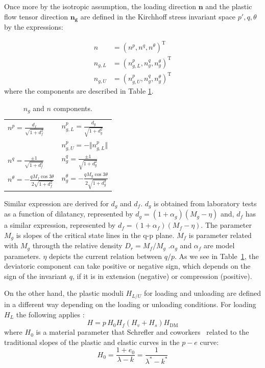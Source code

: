 \documentclass[preprint,12pt,a4paper]{elsarticle}
\begin{document}
Once more by the isotropic assumption, the loading direction $ \boldsymbol{n}$ and the plastic flow tensor direction $ \boldsymbol{n_g}$ are defined in the Kirchhoff stress invariant space $p', q, \theta $ by the expressions:

\begin{eqnarray}
n &=\left(n^{p}, n^{q}, n^{\theta}\right)^{\mathrm{T}} \\ n_{g,L} &=\left(n_{g,L}^{p}, n_{g}^{q}, n_{g}^{\theta}\right)^{\mathrm{T}}
\\ n_{g,U} &=\left(n_{g,U}^{p}, n_{g}^{q}, n_{g}^{\theta}\right)^{\mathrm{T}}
\end{eqnarray}
where the components are described in Table \ref{tab1}.

\begin{table}[H]
\caption{\label{tab1} $n_{g}$ and $n$ components.} 
\centering
	\begin{tabular}{l|l}
        $n^{p} =\frac{d_{f}}{\sqrt{1+d_{f}^{2}}}$ &
        $n_{g,L}^{p} =\frac{d_{g}}{\sqrt{1+d_{g}^{2}}}$
        \\ 
         &
        $n_{g,U}^{p} = -\Vert n_{g,L}^{p} \Vert$ \\
        $n^{q} =\frac{\pm 1}{\sqrt{1+d_{f}^{2}}}$ &
        $n_{g}^{q} = \frac{\pm 1}{\sqrt{1+d_{g}^{2}}}$ \\  
        $n^{\theta} =-\frac{q M_{f} \cos 3 \theta}{2 \sqrt{1+d_{f}^{2}}}$ &
         $n_{g}^{\theta} =-\frac{q M_{g} \cos 3 \theta}{2 \sqrt{1+d_{g}^{2}}}$
	\end{tabular}
\end{table}

Similar expression are derived for $d_{g}$ and $d_{f}$. $d_{g}$ is obtained from laboratory tests as a function of dilatancy, represented by  $d_{g}=\left(1+\alpha_{g}\right)\left(M_{g}-\eta\right)$ and, $d_{f}$ has a similar expression, represented by   $d_{f}=\left(1+\alpha_{f}\right)\left(M_{f}-\eta\right)$. The parameter $M_{g}$ is slopes of the critical state lines in the q-p plane. $M_{f}$ is parameter related with $M_{g}$ througth the relative density $D_r = M_{f} / M_{g}$  .$\alpha_{g}$ and $\alpha_{f}$ are model parameters. $\eta$ depicts the current relation between $q/p$. As we see in Table~\ref{tab1}, the deviatoric component can take positive or negative sign, which depends on the sign of the invariant $q$, if it is in extension (negative) or compression (positive).

 On the other hand, the plastic moduli $H_{L / U}$ for loading and unloading are defined in a different way depending on the loading or unloading conditions. For loading $H_L$ the following applies :
\begin{equation}
H=p\,H_{0}  H_{f}\left(H_{v}+H_{s}\right) H_{\mathrm{DM}}
\end{equation}\label{Eq_H}
where $H_0$ is a material parameter that Schrefler and coworkers~\cite{Santagiuliana2006} related to the traditional slopes of the plastic and elastic curves in the $p-e$ curve:
\begin{equation}
H_{0}=\frac{1+e_{0}}{\lambda-k}=\frac{1}{\lambda^*-k^*}
\end{equation}
\end{document}
